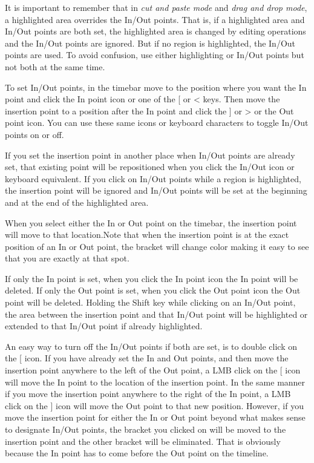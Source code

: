 It is important to remember that in \emph{cut and paste mode} and \emph{drag and drop mode}, a highlighted area 
overrides the In/Out points. That is, if a highlighted area and In/Out points are both set, the highlighted area is changed by editing operations and the In/Out points are ignored. 
But if no region is highlighted, the In/Out points are used. 
To avoid confusion, use either highlighting or In/Out points but not both at the same time.

To set In/Out points, in the timebar move to the position where you want the In point and click the In
point icon or one of the [ or < keys.
Then move the insertion point to a position after the In point and click the ] or > or the Out point icon. 
You can use these same icons or keyboard characters to toggle In/Out points on or off.

If you set the insertion point in another place when In/Out points are already set, that existing point will be
repositioned when you click the In/Out icon or keyboard equivalent. 
If you click on In/Out points while a region is highlighted, the insertion point will be ignored and In/Out points will be set at the beginning and at the end of the highlighted area.

When you select either the In or Out point on the timebar, the insertion point will move to that location.Note that when the insertion point is at the exact position of an In or Out point, the bracket will change
color making it easy to see that you are exactly at that spot.
 
If only the In point is set, when you click the In point icon the In point will be deleted. 
If only the Out point is set, when you click the Out point icon the Out point will be deleted. 
Holding the Shift key while clicking on an In/Out point, the area between the insertion point and that
In/Out point will be highlighted or extended to that In/Out point if already highlighted. 

An easy way to turn off the In/Out points if both are set, is to double click on the [ icon. 
If you have already set the In and Out points, and then move the insertion point anywhere to the left of
the Out point, a LMB click on the [ icon will move the In point to the location of the insertion point.  In the same
manner if you move the insertion point anywhere to the right of the In point, a LMB click on the ] icon
will move the Out point to that new position.  However, if you move the insertion point for either the
In or Out point beyond what makes sense to designate In/Out points, the bracket you clicked on will be
moved to the insertion point and the other bracket will be eliminated.  That is obviously because the
In point has to come before the Out point on the timeline.

